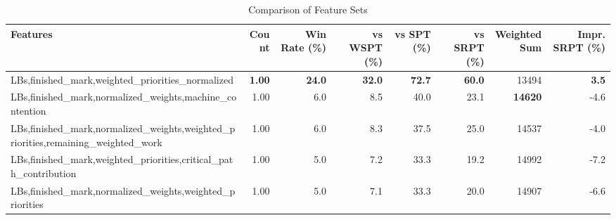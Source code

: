 \begin{table}[htbp]%
\centering%
\begin{tabular}{lrrrrrrr}%
\toprule%
\textbf{Features}&\textbf{Count}&\textbf{Win Rate (\%)}&\textbf{vs WSPT (\%)}&\textbf{vs SPT (\%)}&\textbf{vs SRPT (\%)}&\textbf{Weighted Sum}&\textbf{Impr. SRPT (\%)}\\%
\midrule%
LBs,finished_mark,weighted_priorities_normalized&\textbf{1.00}&\textbf{24.0}&\textbf{32.0}&\textbf{72.7}&\textbf{60.0}&13494&\textbf{3.5}\\%
LBs,finished_mark,normalized_weights,machine_contention&1.00&6.0&8.5&40.0&23.1&\textbf{14620}&-4.6\\%
LBs,finished_mark,normalized_weights,weighted_priorities,remaining_weighted_work&1.00&6.0&8.3&37.5&25.0&14537&-4.0\\%
LBs,finished_mark,weighted_priorities,critical_path_contribution&1.00&5.0&7.2&33.3&19.2&14992&-7.2\\%
LBs,finished_mark,normalized_weights,weighted_priorities&1.00&5.0&7.1&33.3&20.0&14907&-6.6\\%
\bottomrule%
\end{tabular}%
\caption{Comparison of Feature Sets}%
\label{tab:features}%
\end{table}